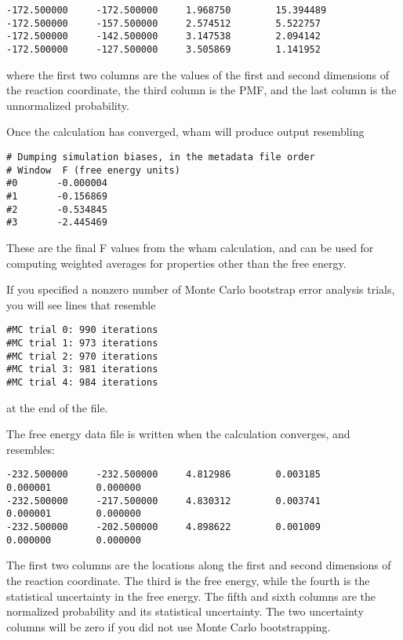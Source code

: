 \documentclass[12pt]{article}
\begin{document}
\begin{verbatim}
-172.500000     -172.500000     1.968750        15.394489
-172.500000     -157.500000     2.574512        5.522757
-172.500000     -142.500000     3.147538        2.094142
-172.500000     -127.500000     3.505869        1.141952
\end{verbatim}
where the first two columns are the values of the first and second
dimensions of the reaction coordinate, the third column is the PMF, and the 
last column is the unnormalized probability.  

Once the calculation has converged, wham will produce output resembling

\begin{verbatim}
# Dumping simulation biases, in the metadata file order 
# Window  F (free energy units)
#0       -0.000004
#1       -0.156869
#2       -0.534845
#3       -2.445469
\end{verbatim}

These are the final F values from the wham calculation, and can be used for
computing weighted averages for properties other than the free energy.

If you specified a nonzero number of Monte Carlo bootstrap error analysis
trials, you will see lines that resemble

\begin{verbatim}
#MC trial 0: 990 iterations
#MC trial 1: 973 iterations
#MC trial 2: 970 iterations
#MC trial 3: 981 iterations
#MC trial 4: 984 iterations
\end{verbatim}
at the end of the file.

The free energy data file is written when the calculation converges, and
resembles:

\begin{footnotesize}
\begin{verbatim}
-232.500000     -232.500000     4.812986        0.003185        0.000001        0.000000
-232.500000     -217.500000     4.830312        0.003741        0.000001        0.000000
-232.500000     -202.500000     4.898622        0.001009        0.000000        0.000000
\end{verbatim}
\end{footnotesize}


The first two columns are the locations along the first and second
dimensions of the reaction coordinate.  The third is the free energy, while
the fourth is the statistical uncertainty in the free energy.  The fifth
and sixth columns are the normalized probability and its statistical
uncertainty.  The two uncertainty columns will be zero if you did not use
Monte Carlo bootstrapping.
\end{document}
